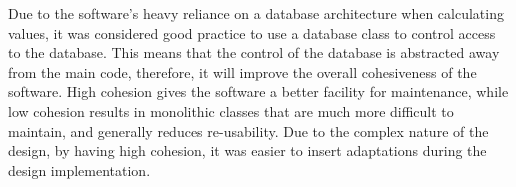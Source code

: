 
Due to the software's heavy reliance on a database architecture when calculating values, it was considered good practice to use a database class to control access to the database. This means that the control of the database is abstracted away from the main code, therefore, it will improve the overall cohesiveness of the software. High cohesion gives the software a better facility for maintenance, while low cohesion results in monolithic classes that are  much more difficult to maintain, and generally reduces re-usability. Due to the complex nature of the design, by having high cohesion, it was easier to insert adaptations during the design implementation.
